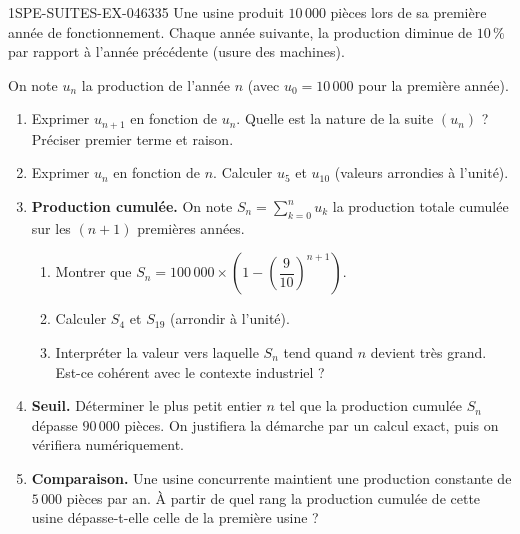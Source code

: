 \begin{exercice}{1SPE-SUITES-EX-046}{3}{35}
Une usine produit $10\,000$ pièces lors de sa première année de fonctionnement. Chaque année suivante, la production diminue de $10\,\%$ par rapport à l'année précédente (usure des machines).

On note $u_n$ la production de l'année $n$ (avec $u_0 = 10\,000$ pour la première année).

\begin{enumerate}
  \item Exprimer $u_{n+1}$ en fonction de $u_n$. Quelle est la nature de la suite $(u_n)$ ? Préciser premier terme et raison.

  \item Exprimer $u_n$ en fonction de $n$. Calculer $u_5$ et $u_{10}$ (valeurs arrondies à l'unité).

  \item \textbf{Production cumulée.} On note $S_n = \displaystyle\sum_{k=0}^{n} u_k$ la production totale cumulée sur les $(n+1)$ premières années.
  \begin{enumerate}
    \item Montrer que $S_n = 100\,000 \times \left(1 - \left(\dfrac{9}{10}\right)^{n+1}\right)$.
    \item Calculer $S_4$ et $S_{19}$ (arrondir à l'unité).
    \item Interpréter la valeur vers laquelle $S_n$ tend quand $n$ devient très grand. Est-ce cohérent avec le contexte industriel ?
  \end{enumerate}

  \item \textbf{Seuil.} Déterminer le plus petit entier $n$ tel que la production cumulée $S_n$ dépasse $90\,000$ pièces. On justifiera la démarche par un calcul exact, puis on vérifiera numériquement.

  \item \textbf{Comparaison.} Une usine concurrente maintient une production constante de $5\,000$ pièces par an. À partir de quel rang la production cumulée de cette usine dépasse-t-elle celle de la première usine ?
\end{enumerate}
\end{exercice}
